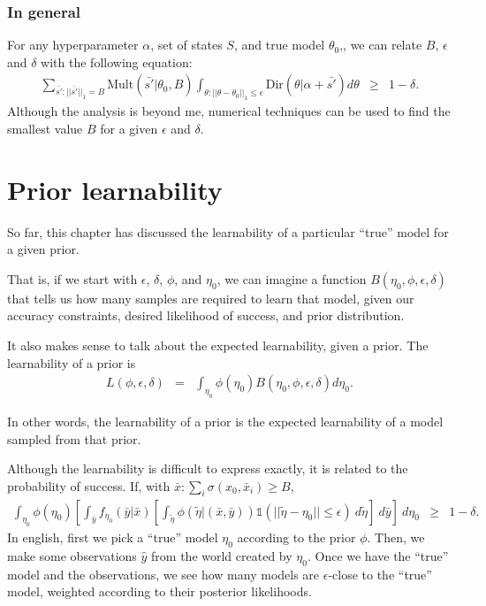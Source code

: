 \subsubsection{In general}

For any hyperparameter $\alpha$, set of states $S$, and true model $\theta_0$,, we can relate $B$, $\epsilon$ and $\delta$ with the following equation:
\begin{eqnarray}
\sum_{\bar {s'}:||\bar {s'}||_1 = B} \limits
 \mbox{Mult}(\bar {s'}|\theta_0,B)
 \int_{\theta:||\theta-\theta_0||_1 \leq \epsilon}\limits
  \mbox{Dir}(\theta|\alpha+\bar{s'})
  d\theta
&\geq& 1-\delta.
\end{eqnarray}
Although the analysis is beyond me, numerical techniques can be used to find the smallest value $B$ for a given $\epsilon$ and $\delta$.

\section{Prior learnability}

So far, this chapter has discussed the learnability of a particular ``true'' model for a given prior.

That is, if we start with $\epsilon$, $\delta$, $\phi$, and $\eta_0$, we can imagine a function $B(\eta_0,\phi,\epsilon,\delta)$ that tells us how many samples are required to learn that model, given our accuracy constraints, desired likelihood of success, and prior distribution.

It also makes sense to talk about the expected learnability, given a prior. The learnability of a prior is
\begin{eqnarray}
L(\phi,\epsilon,\delta)
&=&
\int_{\eta_0} \phi(\eta_0) B(\eta_0,\phi,\epsilon,\delta) d\eta_0.
\end{eqnarray}

In other words, the learnability of a prior is the expected learnability of a model sampled from that prior.

Although the learnability is difficult to express exactly, it is related to the probability of success. If, with $\bar x:\sum_i \sigma(x_0,{\bar x}_i)\geq B$,
\begin{eqnarray}
\label{sec:guarantees:prior-learnability}
\int_{\eta_0}\limits
 \phi(\eta_0) \left[
 \int_{\bar y} \limits
  f_{\eta_0}(\bar y|\bar x) \left[
  \int_{\tilde\eta}\limits
   \phi(\tilde\eta|(\bar x, \bar y))
   \mathbb{1}(||\tilde\eta-\eta_0||\leq\epsilon)
  \ d\tilde\eta \right]
 \ d\bar y \right]
\ d\eta_0
&\geq&
1-\delta.
\end{eqnarray}
In english, first we pick a ``true'' model $\eta_0$ according to the prior $\phi$. Then, we make some observations $\hat y$ from the world created by $\eta_0$. Once we have the ``true'' model and the observations, we see how many models are $\epsilon$-close to the ``true'' model, weighted according to their posterior likelihoods.

